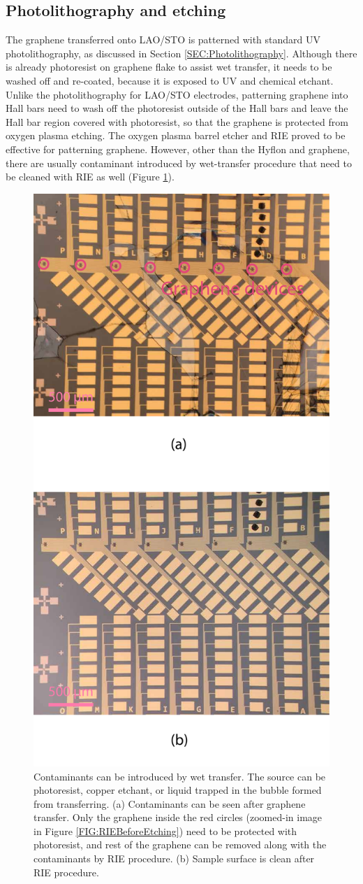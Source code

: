 \documentclass[pdflatex, sectionletters, 12pt]{pittetd}    %
\begin{document}
\subsection{Photolithography and etching}

The graphene transferred onto LAO/STO is patterned with standard UV photolithography, as discussed in Section \ref{SEC:Photolithography}. Although there is already photoresist on graphene flake to assist wet transfer, it needs to be washed off and re-coated, because it is exposed to UV and chemical etchant. Unlike the photolithography for LAO/STO electrodes, patterning graphene into Hall bars need to wash off the photoresist outside of the Hall bars and leave the Hall bar region covered with photoresist, so that the graphene is protected from oxygen plasma etching. The oxygen plasma barrel etcher and RIE proved to be effective for patterning graphene. However, other than the Hyflon and graphene, there are usually contaminant introduced by wet-transfer procedure that need to be cleaned with RIE as well (Figure \ref{FIG:SampleContaminant}). 

\begin{figure}[p]
	\centering
	\includegraphics[width=.55\textwidth]{Drawing/SampleContaminant.pdf}
	\caption{Contaminants can be introduced by wet transfer. The source can be photoresist, copper etchant, or liquid trapped in the bubble formed from transferring. (a) Contaminants can be seen after graphene transfer. Only the graphene inside the red circles (zoomed-in image in Figure \ref{FIG:RIEBeforeEtching}) need to be protected with photoresist, and rest of the graphene can be removed along with the contaminants by RIE procedure. (b) Sample surface is clean after RIE procedure.}
	\label{FIG:SampleContaminant}
\end{figure}
\end{document}
